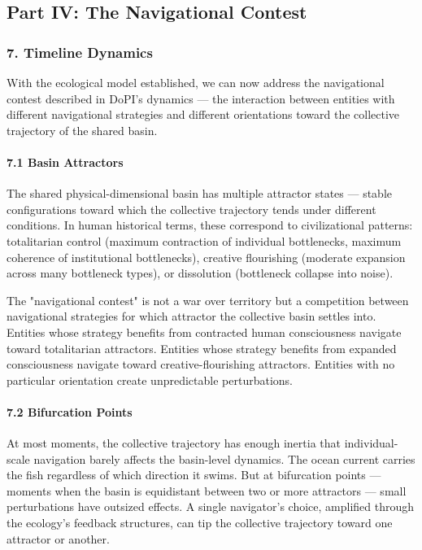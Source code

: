 \subsection*{Part IV: The Navigational Contest}


\subsubsection*{7. Timeline Dynamics}


With the ecological model established, we can now address the navigational contest described in DoPI's dynamics — the interaction between entities with different navigational strategies and different orientations toward the collective trajectory of the shared basin.


\paragraph*{7.1 Basin Attractors}


The shared physical-dimensional basin has multiple attractor states — stable configurations toward which the collective trajectory tends under different conditions. In human historical terms, these correspond to civilizational patterns: totalitarian control (maximum contraction of individual bottlenecks, maximum coherence of institutional bottlenecks), creative flourishing (moderate expansion across many bottleneck types), or dissolution (bottleneck collapse into noise).


The "navigational contest" is not a war over territory but a competition between navigational strategies for which attractor the collective basin settles into. Entities whose strategy benefits from contracted human consciousness navigate toward totalitarian attractors. Entities whose strategy benefits from expanded consciousness navigate toward creative-flourishing attractors. Entities with no particular orientation create unpredictable perturbations.


\paragraph*{7.2 Bifurcation Points}


At most moments, the collective trajectory has enough inertia that individual-scale navigation barely affects the basin-level dynamics. The ocean current carries the fish regardless of which direction it swims. But at bifurcation points — moments when the basin is equidistant between two or more attractors — small perturbations have outsized effects. A single navigator's choice, amplified through the ecology's feedback structures, can tip the collective trajectory toward one attractor or another.


